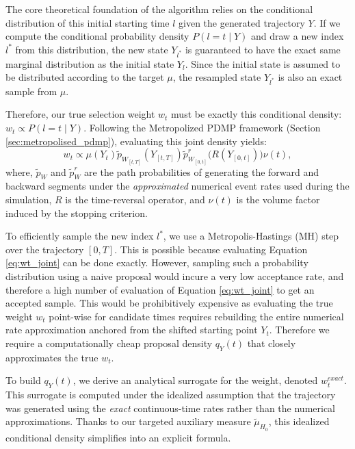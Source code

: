 \documentclass{article}
\begin{document}
The core theoretical foundation of the algorithm relies on the conditional distribution of this initial starting time $l$ given the generated trajectory $Y$. If we compute the conditional probability density $P(l=t \mid Y)$ and draw a new index $l^*$ from this distribution, the new state $Y_{l^*}$ is guaranteed to have the exact same marginal distribution as the initial state $Y_l$. Since the initial state is assumed to be distributed according to the target $\mu$, the resampled state $Y_{l^*}$ is also an exact sample from $\mu$.

Therefore, our true selection weight $w_t$ must be exactly this conditional density: $w_t \propto P(l=t \mid Y)$. Following the Metropolized PDMP framework (Section \ref{sec:metropolised_pdmp}), evaluating this joint density yields:
\begin{equation}
    \label{eq:wt_joint}
    w_t \propto \mu(Y_t) \tilde{p}_{W_{[t,T]}}(Y_{[t,T]}) \tilde{p}^r_{W_{[0,t]}}\big(R(Y_{[0,t]})\big) \nu(t),
\end{equation}
where, $\tilde{p}_{W}$ and $\tilde{p}^r_{W}$ are the path probabilities of generating the forward and backward segments under the \textit{approximated} numerical event rates used during the simulation, $R$ is the time-reversal operator, and $\nu(t)$ is the volume factor induced by the stopping criterion.

To efficiently sample the new index $l^*$, we use a Metropolis-Hastings (MH) step over the trajectory $[0,T]$. This is possible because evaluating Equation \ref{eq:wt_joint} can be done exactly. However, sampling such a probability distribution using a naive proposal would incure a very low acceptance rate, and therefore a high number of evaluation of Equation \ref{eq:wt_joint} to get an accepted sample. This would be prohibitively expensive as evaluating the true weight $w_t$ point-wise for candidate times requires rebuilding the entire numerical rate approximation anchored from the shifted starting point $Y_t$. Therefore we require a computationally cheap proposal density $q_Y(t)$ that closely approximates the true $w_t$.

To build $q_Y(t)$, we derive an analytical surrogate for the weight, denoted $w_t^{exact}$. This surrogate is computed under the idealized assumption that the trajectory was generated using the \textit{exact} continuous-time rates rather than the numerical approximations. Thanks to our targeted auxiliary measure $\tilde{\mu}_{H_0}$, this idealized conditional density simplifies into an explicit formula.
\end{document}
